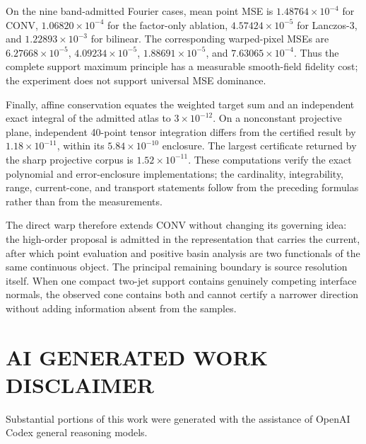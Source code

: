 \documentclass[journal]{IEEEtran}
\begin{document}
On the nine band-admitted Fourier cases, mean point MSE is
\(1.48764\times10^{-4}\) for CONV, \(1.06820\times10^{-4}\) for the
factor-only ablation, \(4.57424\times10^{-5}\) for Lanczos-3, and
\(1.22893\times10^{-3}\) for bilinear.  The corresponding warped-pixel MSEs
are \(6.27668\times10^{-5}\), \(4.09234\times10^{-5}\),
\(1.88691\times10^{-5}\), and \(7.63065\times10^{-4}\).  Thus the complete
support maximum principle has a measurable smooth-field fidelity cost; the
experiment does not support universal MSE dominance.

Finally, affine conservation equates the weighted target sum and an
independent exact integral of the admitted atlas to \(3\times10^{-12}\).  On
a nonconstant projective plane, independent 40-point tensor integration
differs from the certified result by \(1.18\times10^{-11}\), within its
\(5.84\times10^{-10}\) enclosure.  The largest certificate returned by the
sharp projective corpus is \(1.52\times10^{-11}\).  These computations verify
the exact polynomial and error-enclosure implementations; the cardinality,
integrability, range, current-cone, and transport statements follow from the
preceding formulas rather than from the measurements.

The direct warp therefore extends CONV without changing its governing idea:
the high-order proposal is admitted in the representation that carries the
current, after which point evaluation and positive basin analysis are two
functionals of the same continuous object.  The principal remaining boundary
is source resolution itself.  When one compact two-jet support contains
genuinely competing interface normals, the observed cone contains both and
cannot certify a narrower direction without adding information absent from
the samples.

\section*{AI GENERATED WORK DISCLAIMER}

Substantial portions of this work were generated with the assistance of
OpenAI Codex general reasoning models.
\end{document}
